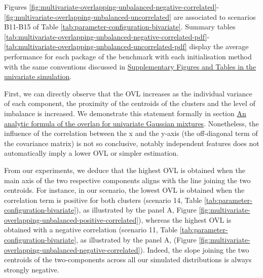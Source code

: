 Figures \ref{fig:multivariate-overlapping-unbalanced-negative-correlated}-
\ref{fig:multivariate-overlapping-unbalanced-uncorrelated} are associated to scenarios B11-B15 of Table \ref{tab:parameter-configuration-bivariate}. Summary tables
\ref{tab:multivariate-overlapping-unbalanced-negative-correlated-pdf}-
\ref{tab:multivariate-overlapping-unbalanced-uncorrelated-pdf}
display the average performance for each package of the benchmark with
each initialisation method with the same conventions discussed in \protect\hyperlink{supplementary-figures-and-tables-in-the-univariate-simulation}{Supplementary Figures and Tables in the univariate simulation}.

First, we can directly observe that the OVL increases as the individual variance of each component, the proximity of the centroids of the clusters and the level of imbalance is increased. We demonstrate this statement formally in section \protect\hyperlink{an-analytic-formula-of-the-overlap-for-univariate-gaussian-mixtures}{An analytic formula of the overlap for univariate Gaussian mixtures}. Nonetheless, the influence of the correlation between the x and the y-axis (the off-diagonal term of the covariance matrix) is not so conclusive, notably independent features does not automatically imply a lower OVL or simpler estimation.

From our experiments, we deduce that the highest OVL is obtained when the main axis of the two respective components aligns with the line joining the two centroids. For instance, in our scenario, the lowest OVL is obtained when the correlation term is positive for both clusters (scenario 14, Table \ref{tab:parameter-configuration-bivariate}), as illustrated by the panel A, Figure \ref{fig:multivariate-overlapping-unbalanced-positive-correlated}), whereas the highest OVL is obtained with a negative correlation (scenario 11, Table \ref{tab:parameter-configuration-bivariate}, as illustrated by the panel A, (Figure \ref{fig:multivariate-overlapping-unbalanced-negative-correlated}). Indeed, the slope joining the two centroids of the two-components across all our simulated distributions is always strongly negative.

